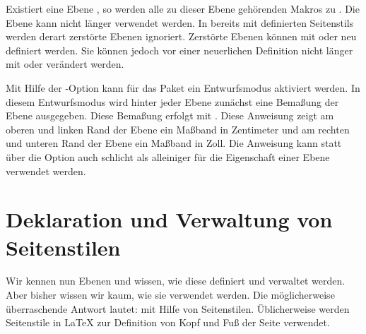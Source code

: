 \begin{Declaration}
\end{Declaration}
Existiert eine Ebene , so werden alle zu dieser Ebene
gehörenden Makros zu . Die Ebene kann nicht länger verwendet
werden. In bereits mit  definierten Seitenstils werden
derart zerstörte Ebenen ignoriert. Zerstörte Ebenen können mit
 oder
 neu definiert werden. Sie können jedoch
vor einer neuerlichen Definition nicht länger mit
 oder
 verändert werden.%
\iffalse %
\par
Die Anweisung ist dazu bestimmt, innerhalb des Arguments \PName{Code} von
\DescRef{\LabelBase.cmd.scrlayerOnAutoRemoveInterface} (siehe
\autoref{sec:scrlayer.enduserinterfaces},
\DescPageRef{scrlayer.cmd.scrlayerOnAutoRemoveInterface}) verwendet zu
werden. Damit können Ebenen, die unter Verwendung von entfernbaren Anweisungen
einer entfernbaren Benutzerschnittstelle definiert wurden, zusammen mit dieser
Benutzerschnittstelle entfernt werden.%
\fi%
\EndIndexGroup


\begin{Declaration}
\end{Declaration}
Mit Hilfe der \KOMAScript-Option  kann für das Paket
 ein Entwurfsmodus aktiviert werden. In diesem Entwurfsmodus
wird hinter jeder Ebene zunächst eine Bemaßung der Ebene ausgegeben. Diese
Bemaßung erfolgt mit . Diese Anweisung zeigt am
oberen und linken Rand der Ebene ein Maßband in Zentimeter und am rechten und
unteren Rand der Ebene ein Maßband in Zoll. Die Anweisung
 kann statt über die Option auch schlicht als
alleiniger  für die Eigenschaft  einer Ebene
verwendet werden.%
%
\EndIndexGroup


\section{Deklaration und Verwaltung von Seitenstilen}

\BeginIndexGroup%
%
Wir kennen nun Ebenen und wissen, wie diese definiert und verwaltet
werden. Aber bisher wissen wir kaum, wie sie verwendet werden. Die
möglicherweise überraschende Antwort lautet: mit Hilfe von
Seitenstilen. Üblicherweise werden Seitenstile in \LaTeX{} zur Definition von
Kopf und Fuß der Seite verwendet.

